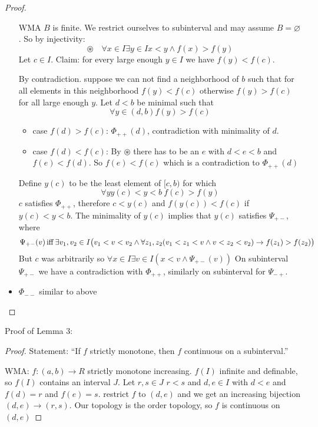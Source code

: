 \begin{proof}
\begin{itemize}
        WMA $B$ is finite.
        We restrict ourselves to subinterval and may assume $B=\varnothing$. 
        So by injectivity: 
        $$\circledast \quad\forall x \in I \exists y\in I x<y\land f(x)>f(y)$$
        Let $c\in I$. Claim: for every large enough $y\in I$ we have $f(y)<f(c)$.
        \begin{claimproof}
            By contradiction. suppose we can not find a neighborhood of $b$ such that for all elements in this neighborhood $f(y)<f(c)$
            otherwise $f(y)>f(c)$ for all large enough $y$.
            Let $d<b$ be minimal such that 
            \[\forall y\in (d,b) f(y)>f(c)\]
            \begin{itemize}
                \item case $f(d)>f(c)$: $\Phi_{++}(d)$, contradiction with minimality of $d$.
                \item case $f(d)<f(c)$: By $\circledast$ there has to be an $e$ with $d<e<b$ and 
                $f(e)<f(d)$. So $f(e)<f(c)$ which is a contradiction to $\Phi_{++}(d)$
            \end{itemize}
        \end{claimproof} 
        Define $y(c)$ to be the least element of $[c,b)$ for which 
        $$\forall y y(c)<y<b \: f(c)>f(y)$$ 
        $c$ satisfies $\Phi_{++}$, therefore $c<y(c)$ and $f(y(c))<f(c)$ if $y(c)<y<b$.
        The minimality of $y(c)$ implies that $y(c)$ satisfies $\Psi_{+-}$, where 
        \[\Psi_{+-}(v) \operatorname{iff} \exists v_1,v_2 \in I \bigl(v_1<v<v_2 \land \forall z_1,z_2 (v_1<z_1<v\land v<z_2<v_2)\to f(z_1)>f(z_2)\bigr)\]
        But $c$ was arbitrarily so $\forall x\in I \exists v\in I (x<v\land \Psi_{+-}(v))$
        On subinterval $\Psi_{+-}$ 
        we have a contradiction with $\Phi_{++}$, similarly on subinterval for $\Psi_{-+}$.
        \item $\Phi_{--}$ similar to above
    \end{itemize}
\end{proof}
Proof of Lemma 3:
\begin{proof}
    Statement: ``If $f$ strictly monotone, then $f$ continuous on a subinterval.''

    WMA: $f:(a,b)\to R$ strictly monotone increasing.
    $f(I)$ infinite and definable, so $f(I)$ contains an interval $J$.
    Let $r,s\in J$ $r<s$ and $d,e\in I$ with $d<e$ and $f(d)=r$ and $f(e) = s$.
    restrict $f$ to $(d,e)$ and we get an increasing bijection $(d,e)\to (r,s)$.
    Our topology is the order topology, so $f$ is continuous on $(d,e)$
\end{proof}

